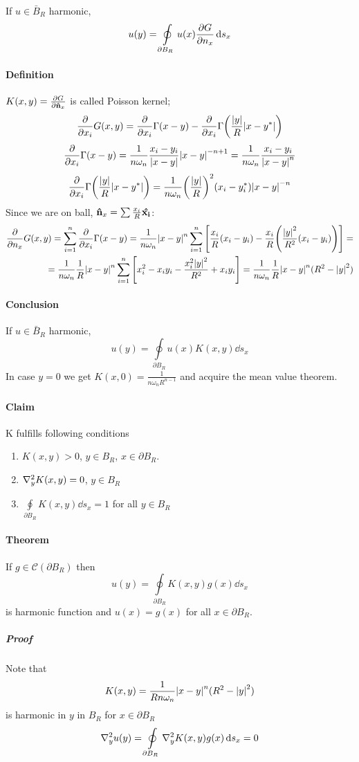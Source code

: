 If $u \in \bar{B}_R$ harmonic,
$$u(y) = \oint\limits_{\partial B_R} u(x) \pdv{G}{n_x} (x,y) \dd{s_x}$$

\paragraph{Definition} $K(x,y) = \pdv{G}{\vu{n}_x} (x,y)$ is called Poisson kernel;
$$\pdv{x_i} G(x,y) = \pdv{x_i} \Gamma(x-y) - \pdv{x_i} \Gamma\qty(\frac{\abs{y}}{R} \abs{x-y^*})$$
$$\pdv{x_i} \Gamma(x-y) = \frac{1}{n\omega_n} \frac{x_i-y_i}{\abs{x-y}} \abs{x-y}^{-n+1} = \frac{1}{n\omega_n}\frac{x_i-y_i}{\abs{x-y}^n}$$ 
$$\pdv{x_i} \Gamma\qty(\frac{\abs{y}}{R} \abs{x-y^*}) = \frac{1}{n\omega_n} \qty(\frac{\abs{y}}{R})^2 (x_i - y^*_i) \abs{x-y}^{-n}$$
Since we are on ball, $\vu{n}_x = \sum \frac{x_i}{R} \vu{x_i}$:
\begin{align*}
\pdv{n_x} G(x,y) = \sum_{i=1}^n \pdv{x_i} \Gamma(x-y) = \frac{1}{n\omega_n} \abs{x-y}^n \sum_{i=1}^n \qty[\frac{x_i}{R}(x_i-y_i) - \frac{x_i}{R}\qty(\frac{\abs{y}^2}{R^2}(x_i-y_i)) ]  =\\= \frac{1}{n\omega_n} \frac{1}{R}\abs{x-y}^n \sum_{i=1}^n \qty[x_i^2 - x_iy_i - \frac{x_i^2\abs{y}^2}{R^2} + x_iy_i ] = \frac{1}{n\omega_n} \frac{1}{R}\abs{x-y}^n(R^2-\abs{y}^2)
\end{align*}
\paragraph{Conclusion}
If $u \in \bar{B}_R$ harmonic,
$$u(y) = \oint\limits_{\partial B_R} u(x) K (x,y) \dd{s_x}$$
In case $y=0$ we get $K(x,0) = \frac{1}{n\omega_n R^{n-1}}$ and acquire the mean value theorem.

\paragraph{Claim}
K fulfills following conditions
\begin{enumerate}
	\item $K(x,y)>0$, $y\in B_R$, $x\in \partial B_R$.
	\item $\laplacian_y K(x,y) = 0$, $y\in B_R$
	\item $\oint\limits_{\partial B_R}  K (x,y) \dd{s_x} = 1$ for all $y\in B_R$
\end{enumerate}

\paragraph{Theorem}
If $g \in \mathcal{C}(\partial B_R)$ then 
$$u(y) = \oint\limits_{\partial B_R}  K (x,y)g(x) \dd{s_x}$$
is harmonic function and $u(x) = g(x) $ for all $x\in \partial B_R$.
\subparagraph{Proof}
Note that
$$K(x,y) = \frac{1}{Rn\omega_n}\abs{x-y}^n(R^2-\abs{y}^2)$$
is harmonic in $y$ in $B_R$ for $x \in \partial B_R$
$$\laplacian_y{u(y)} = \oint\limits_{\partial B_R} \laplacian_y K (x,y)g(x) \dd{s_x} = 0$$

